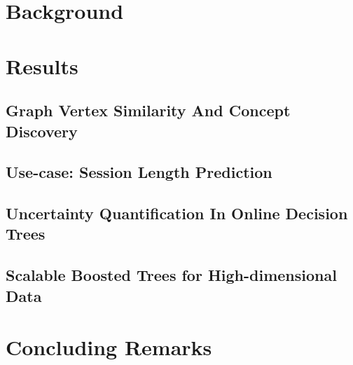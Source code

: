 \documentclass[g5paper,twoside,phd,electronic]{kthesis}
\begin{document}
\frontmatter
\maketitle
\makecopyright
\makededication



\tableofcontents*
\listoffigures
\listoftables
\listofalgorithms
\mainmatter

\newpage
\part{Background}
\label{part:bg}

\newpage

\newpage

\newpage

\newpage
%
\part{Results}
\label{part:results}
\chapter{Graph Vertex Similarity And Concept Discovery}
\label{ch:concepts}

\newpage
\chapter{Use-case: Session Length Prediction}
\label{ch:session-length}

\newpage
\chapter{Uncertainty Quantification In Online Decision Trees}
\label{ch:uncertain-trees}

\newpage
\chapter{Scalable Boosted Trees for High-dimensional Data}
\label{ch:boosted-trees}

\newpage
\part{Concluding Remarks}
\label{part:conclusion}

\newpage

\backmatter
\printindex

\end{document}
